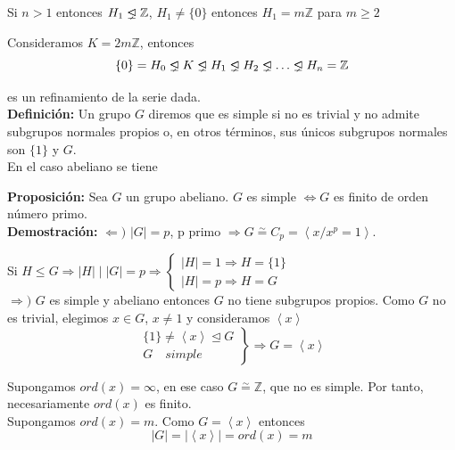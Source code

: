 \documentclass{article}
\newcommand{\unlhdneq}{%
  \mathrel{\ooalign{$\lneq$\cr\raise.22ex\hbox{$\lhd$}\cr}}}
\begin{document}
Si $n>1$ entonces $H_1\unlhdneq \mathbb{Z}$, $H_1\neq \{0\}$ entonces $H_1=m\mathbb{Z}$ para $m\geq 2$

Consideramos $K=2m\mathbb{Z}$, entonces
\begin{equation*}
\{0\}=H_0\unlhdneq K\unlhdneq H_1 \unlhdneq H_2\unlhdneq \ldots \unlhdneq H_n=\mathbb{Z}
\end{equation*}

es un refinamiento de la serie dada. \\

\textbf{Definición:} Un grupo $G$ diremos que es simple si no es trivial y no admite subgrupos normales propios o, en otros términos, sus únicos subgrupos normales son $\{1\}$ y $G$. \\

En el caso abeliano se tiene

\textbf{Proposición:} Sea $G$ un grupo abeliano. $G$ es simple $\Leftrightarrow G$ es finito de orden número primo. \\

\textbf{Demostración:} $\Leftarrow)$ $|G|=p$, p primo $\Rightarrow G\overset{\sim}{=} C_p=\left\langle x/x^p=1\right\rangle$.

Si $H\leq G\Rightarrow |H|\mid |G|=p\Rightarrow \left\lbrace \begin{array}{c}
|H|=1\Rightarrow H=\{1\}\\
|H|=p\Rightarrow H=G
\end{array} \right.$ \\

$\Rightarrow)$ $G$ es simple y abeliano entonces $G$ no tiene subgrupos propios. Como $G$ no es trivial, elegimos $x\in G$, $x\neq 1$ y consideramos $\left\langle x \right\rangle$
\begin{equation*}
\left. \begin{array}{c}
\{1\}\neq \left\langle x\right\rangle \unlhd G \\
G\quad simple
\end{array}\right\rbrace \Rightarrow G=\left\langle x\right\rangle
\end{equation*}

Supongamos $ord(x)=\infty$, en ese caso $G\overset{\sim}{=} \mathbb{Z}$, que no es simple. Por tanto, necesariamente $ord(x)$ es finito. \\

Supongamos $ord(x)=m$. Como $G=\left\langle x\right\rangle$ entonces
\begin{equation*}
|G|=|\left\langle x \right\rangle |=ord(x)=m
\end{equation*}
\end{document}
